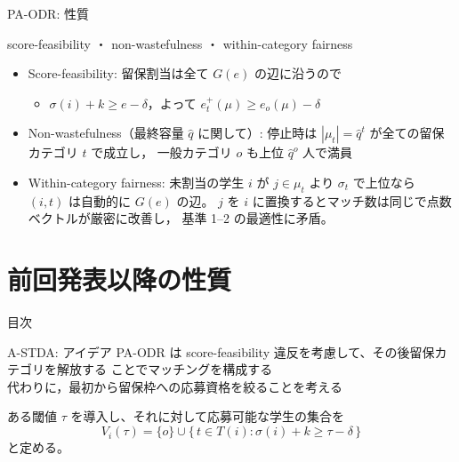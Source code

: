 \documentclass[aspectratio=43,11pt]{beamer}
\newcommand{\muc}[1]{\mu_{#1}}
\newcommand{\eo}{e_o}
\newcommand{\et}{e_t^{+}}
\newcommand{\score}{\sigma}
\begin{document}
\begin{frame}{PA-ODR: 性質}
  \begin{block}{score-feasibility ・ non-wastefulness ・ within-category fairness}
    \begin{itemize}
      \item Score-feasibility: 留保割当は全て $G(e)$ の辺に沿うので
        \begin{itemize}
          \item $\score(i) + k \ge e - \delta$，よって
            $\et(\mu) \ge \eo(\mu) - \delta$
        \end{itemize}
      \item Non-wastefulness（最終容量 $\hat q$ に関して）: 停止時は
        $|\muc{t}| = \hat q^{t}$ が全ての留保カテゴリ $t$ で成立し，
        一般カテゴリ $o$ も上位 $\hat q^{o}$ 人で満員
      \item Within-category fairness: 未割当の学生 $i$ が $j \in \muc{t}$
        より $\score_t$ で上位なら $(i, t)$ は自動的に $G(e)$ の辺。
        $j$ を $i$ に置換するとマッチ数は同じで点数ベクトルが厳密に改善し，
        基準 1--2 の最適性に矛盾。
    \end{itemize}
  \end{block}
\end{frame}

\section{前回発表以降の性質}

\begin{frame}{目次}
  \tableofcontents[currentsection]
\end{frame}

\begin{frame}{A-STDA: アイデア}
  PA-ODR は score-feasibility 違反を考慮して、その後留保カテゴリを解放する
  ことでマッチングを構成する\\
  代わりに，最初から留保枠への応募資格を絞ることを考える

  \vspace{1em}
  ある{\color{red}閾値} $\tau$ を導入し、それに対して応募可能な学生の集合を
  \[
    V_i(\tau) = \{o\} \cup \{\, t \in T(i) : \score(i) + k \ge \tau - \delta \,\}
  \]
  と定める。
\end{frame}
\end{document}
